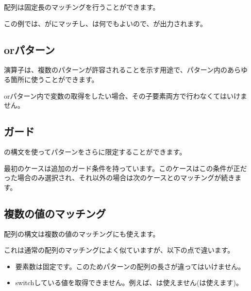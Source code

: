 配列は固定長のマッチングを行うことができます。


この例では、がにマッチし、は何でもよいので、が出力されます。

\subsection{orパターン}
\label{lf-pattern-matching-or}

\expr{|}演算子は、複数のパターンが許容されることを示す用途で、パターン内のあらゆる箇所に使うことができます。


orパターン内で変数の取得をしたい場合、その子要素両方で行わなくてはいけません。

\subsection{ガード}
\label{lf-pattern-matching-guards}

の構文を使ってパターンをさらに限定することができます。


最初のケースは追加のガード条件を持っています。このケースはこの条件が正だった場合のみ選択され、それ以外の場合は次のケースとのマッチングが続きます。

\subsection{複数の値のマッチング}
\label{lf-pattern-matching-tuples}

配列の構文は複数の値のマッチングにも使えます。


これは通常の配列のマッチングによく似ていますが、以下の点で違います。

\begin{itemize}
	\item 要素数は固定です。このためパターンの配列の長さが違ってはいけません。
	\item switchしている値を取得できません。例えば、は使えません(は使えます)。
\end{itemize}

